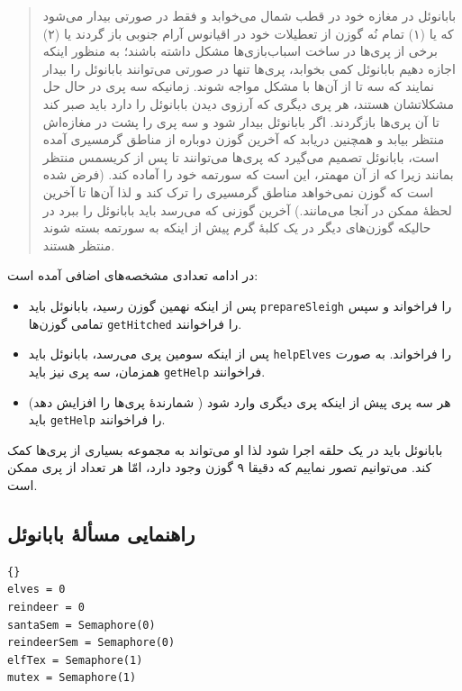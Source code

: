 \documentclass{book}
\newcommand{\clearemptydoublepage}{\newpage\cleardoublepage}
\begin{document}
\begin{quotation}
    بابانوئل در مغازه خود در قطب شمال می‌خوابد و فقط در صورتی بیدار می‌شود که یا (۱) تمام نُه گوزن از تعطیلات خود در اقیانوس آرام جنوبی باز گردند یا (۲)
    برخی از پری‌ها در ساخت اسباب‌بازی‌ها مشکل داشته باشند؛ به منظور اینکه اجازه دهیم بابانوئل کمی بخوابد، پری‌ها تنها در صورتی می‌توانند 
    بابانوئل را بیدار نمایند که سه تا از آن‌ها با مشکل مواجه شوند. زمانیکه سه پری در حال حل مشکلاتشان هستند،‌ هر پری دیگری که آرزوی دیدن بابانوئل را دارد 
    باید صبر کند تا آن پری‌ها بازگردند. اگر بابانوئل بیدار شود و سه پری را پشت در مغازه‌اش منتظر بیابد و همچنین دریابد که آخرین گوزن دوباره  از مناطق 
    گرمسیری آمده است، بابانوئل تصمیم می‌گیرد که پری‌ها می‌توانند تا پس از کریسمس منتظر بمانند زیرا که از آن مهمتر، این است که سورتمه خود را آماده کند. 
    (فرض شده است که گوزن نمی‌خواهد مناطق گرمسیری را ترک کند و لذا آن‌ها تا آخرین لحظهٔ ممکن در آنجا می‌مانند.)
    آخرین گوزنی که می‌رسد باید بابانوئل را ببرد در حالیکه گوزن‌های دیگر در یک کلبهٔ گرم پیش از اینکه به سورتمه بسته شوند منتظر هستند. 
\end{quotation}

    در ادامه تعدادی مشخصه‌های اضافی آمده است: 

\begin {itemize}

\item 
    پس از اینکه نهمین گوزن رسید، بابانوئل باید {\tt prepareSleigh} را فراخواند و سپس تمامی گوزن‌ها  {\tt getHitched} را فراخوانند. 

\item 
    پس از اینکه سومین پری می‌رسد، بابانوئل باید  {\tt helpElves} را فراخواند. به صورت همزمان، سه پری نیز باید {\tt getHelp} فراخوانند. 

\item 
    هر سه پری پیش از اینکه پری دیگری وارد شود ( شمارندهٔ پری‌ها را افزایش دهد) باید {\tt getHelp} را فراخوانند.

\end {itemize}

    بابانوئل باید در یک حلقه اجرا شود لذا او می‌تواند به مجموعه بسیاری از پری‌ها کمک کند. می‌توانیم تصور نماییم که دقیقا ۹ گوزن وجود دارد، امّا 
    هر تعداد از پری ممکن است. 

\clearemptydoublepage
\subsection {راهنمایی مسألهٔ بابانوئل}

\begin{latin}
\begin{lstlisting}[title=\rl{راهنمایی مسأله بابانوئل}]{}
elves = 0
reindeer = 0
santaSem = Semaphore(0)
reindeerSem = Semaphore(0)
elfTex = Semaphore(1)
mutex = Semaphore(1)
\end{lstlisting}
\end{latin}
\end{document}
